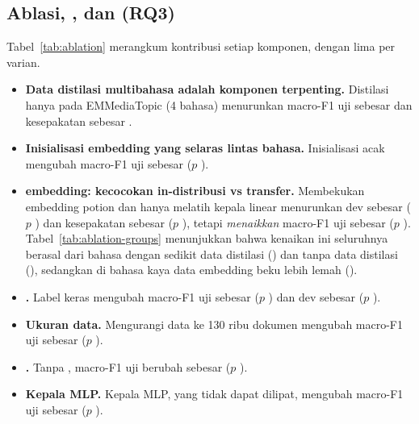 \subsection{Ablasi, , dan  (RQ3)}
\TabAblation
\TabAblationGroups
Tabel~\ref{tab:ablation} merangkum kontribusi setiap komponen, dengan lima  per varian.
\begin{itemize}
  \item \textbf{Data distilasi multibahasa adalah komponen terpenting.} Distilasi hanya pada EMMediaTopic (4 bahasa) menurunkan macro-F1 uji sebesar  dan kesepakatan  sebesar .
  \item \textbf{Inisialisasi embedding yang selaras lintas bahasa.} Inisialisasi acak mengubah macro-F1 uji sebesar  ($p$ ).
  \item \textbf{ embedding: kecocokan in-distribusi vs transfer.} Membekukan embedding potion dan hanya melatih kepala linear menurunkan dev sebesar  ($p$ ) dan kesepakatan  sebesar  ($p$ ), tetapi \emph{menaikkan} macro-F1 uji sebesar  ($p$ ). Tabel~\ref{tab:ablation-groups} menunjukkan bahwa kenaikan ini seluruhnya berasal dari bahasa dengan sedikit data distilasi () dan tanpa data distilasi (), sedangkan di bahasa kaya data embedding beku lebih lemah ().
  \item \textbf{.} Label keras  mengubah macro-F1 uji sebesar  ($p$ ) dan dev sebesar  ($p$ ).
  \item \textbf{Ukuran data.} Mengurangi data ke 130 ribu dokumen mengubah macro-F1 uji sebesar  ($p$ ).
  \item \textbf{.} Tanpa , macro-F1 uji berubah sebesar  ($p$ ).
  \item \textbf{Kepala MLP.} Kepala MLP, yang tidak dapat dilipat, mengubah macro-F1 uji sebesar  ($p$ ).
\end{itemize}

